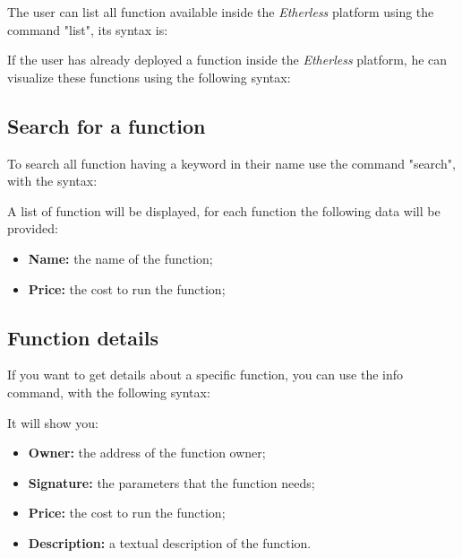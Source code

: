 The user can list all function available inside the \textit{Etherless} platform using the command "list", its syntax is: 
\begin{center}
\end{center}
If the user has already deployed a function inside the \textit{Etherless} platform, he can visualize these functions using the following syntax: 
\begin{center}
\end{center}

\subsection{Search for a function}
To search all function having a keyword in their name use the command "search", with the syntax: 
\begin{center}
\end{center}

A list of function will be displayed, for each function the following data will be provided:
\begin{itemize}
	\item \textbf{Name: } the name of the function; 
	\item \textbf{Price: } the cost to run the function; 
\end{itemize} 

\subsection{Function details}
If you want to get details about a specific function, you can use the info command, with the following syntax: \\ 
\begin{center}
\end{center}
It will show you: 
\begin{itemize}
	\item \textbf{Owner: } the address of the function owner; 
	\item \textbf{Signature: } the parameters that the function needs;   
	\item \textbf{Price: } the cost to run the function; 
	\item \textbf{Description: } a textual description of the function.
\end{itemize}

